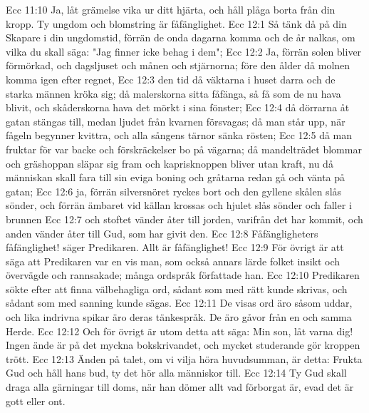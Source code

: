 Ecc 11:10  Ja, låt grämelse vika ur ditt hjärta, och håll plåga borta från din kropp. Ty ungdom och blomstring är fåfänglighet.
Ecc 12:1  Så tänk då på din Skapare i din ungdomstid, förrän de onda dagarna komma och de år nalkas, om vilka du skall säga: "Jag finner icke behag i dem";
Ecc 12:2  Ja, förrän solen bliver förmörkad, och dagsljuset och månen och stjärnorna; före den ålder då molnen komma igen efter regnet,
Ecc 12:3  den tid då väktarna i huset darra och de starka männen kröka sig; då malerskorna sitta fåfänga, så få som de nu hava blivit, och skåderskorna hava det mörkt i sina fönster;
Ecc 12:4  då dörrarna åt gatan stängas till, medan ljudet från kvarnen försvagas; då man står upp, när fågeln begynner kvittra, och alla sångens tärnor sänka rösten;
Ecc 12:5  då man fruktar för var backe och förskräckelser bo på vägarna; då mandelträdet blommar och gräshoppan släpar sig fram och kaprisknoppen bliver utan kraft, nu då människan skall fara till sin eviga boning och gråtarna redan gå och vänta på gatan;
Ecc 12:6  ja, förrän silversnöret ryckes bort och den gyllene skålen slås sönder, och förrän ämbaret vid källan krossas och hjulet slås sönder och faller i brunnen
Ecc 12:7  och stoftet vänder åter till jorden, varifrån det har kommit, och anden vänder åter till Gud, som har givit den.
Ecc 12:8  Fåfängligheters fåfänglighet! säger Predikaren. Allt är fåfänglighet!
Ecc 12:9  För övrigt är att säga att Predikaren var en vis man, som också annars lärde folket insikt och övervägde och rannsakade; många ordspråk författade han.
Ecc 12:10  Predikaren sökte efter att finna välbehagliga ord, sådant som med rätt kunde skrivas, och sådant som med sanning kunde sägas.
Ecc 12:11  De visas ord äro såsom uddar, och lika indrivna spikar äro deras tänkespråk. De äro gåvor från en och samma Herde.
Ecc 12:12  Och för övrigt är utom detta att säga: Min son, låt varna dig! Ingen ände är på det myckna bokskrivandet, och mycket studerande gör kroppen trött.
Ecc 12:13  Änden på talet, om vi vilja höra huvudsumman, är detta: Frukta Gud och håll hans bud, ty det hör alla människor till.
Ecc 12:14  Ty Gud skall draga alla gärningar till doms, när han dömer allt vad förborgat är, evad det är gott eller ont.


